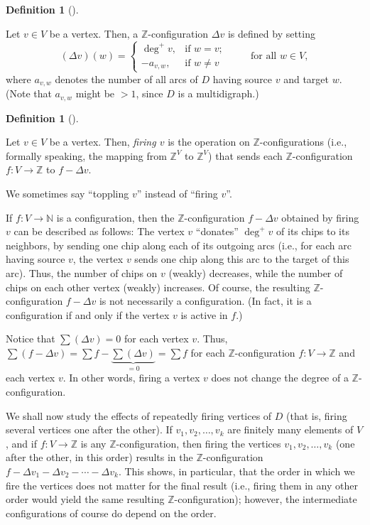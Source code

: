 \documentclass[numbers=enddot,12pt,final,onecolumn,notitlepage]{scrartcl}%
\theoremstyle{definition}
\newtheorem{defi}[theo]{Definition}
\newenvironment{definition}[1][]
{\begin{defi}[#1]\begin{leftbar}}
{\end{leftbar}\end{defi}}
\let\sumnonlimits\sum
\renewcommand{\sum}{\sumnonlimits\limits}
\newcommand{\NN}{\mathbb{N}}
\newcommand{\ZZ}{\mathbb{Z}}
\newcommand{\tup}[1]{\left( #1 \right)}
\begin{document}
\begin{definition}
Let $v \in V$ be a vertex.
Then, a $\ZZ$-configuration $\Delta v$ is defined by setting
\[
 \tup{\Delta v} \tup{w}
 = \begin{cases}
    \deg^+ v , & \text{if } w = v ; \\
    - a_{v, w}, & \text{if } w \neq v
   \end{cases}
  \qquad \text{ for all } w \in V ,
\]
where $a_{v, w}$ denotes the number of all arcs of $D$ having
source $v$ and target $w$.
(Note that $a_{v, w}$ might be $> 1$, since $D$ is a multidigraph.)
\end{definition}

\begin{definition}
Let $v \in V$ be a vertex.
Then, \textit{firing $v$} is the operation on
$\ZZ$-configurations (i.e., formally speaking, the mapping from
$\ZZ^V$ to $\ZZ^V$) that sends each $\ZZ$-configuration
$f : V \to \ZZ$ to $f - \Delta v$.

We sometimes say ``toppling $v$'' instead of ``firing $v$''.
\end{definition}

If $f : V \to \NN$ is a configuration, then the
$\ZZ$-configuration $f - \Delta v$ obtained by firing $v$ can be
described as follows:
The vertex $v$ ``donates'' $\deg^+ v$ of its chips to its
neighbors, by sending one chip along each of its outgoing arcs
(i.e., for each arc having source $v$, the vertex $v$ sends one
chip along this arc to the target of this arc).
Thus, the number of chips on $v$ (weakly) decreases, while the
number of chips on each other vertex (weakly) increases.
Of course, the resulting $\ZZ$-configuration $f - \Delta v$ is
not necessarily a configuration.
(In fact, it is a configuration if and only if the vertex $v$ is
active in $f$.)

Notice that $\sum \tup{\Delta v} = 0$ for each vertex $v$.
Thus,
$\sum \tup{f - \Delta v}
= \sum f - \underbrace{\sum \tup{\Delta v}}_{= 0}
= \sum f$
for each $\ZZ$-configuration $f : V \to \ZZ$ and each vertex $v$.
In other words, firing a vertex $v$ does not change the degree of
a $\ZZ$-configuration.

We shall now study the effects of repeatedly firing vertices
of $D$ (that is, firing several vertices one after the other).
If $v_1, v_2, \ldots, v_k$ are finitely many elements of $V$,
and if $f : V \to \ZZ$ is any $\ZZ$-configuration,
then firing the vertices $v_1, v_2, \ldots, v_k$
(one after the other, in this order) results in the
$\ZZ$-configuration
$f - \Delta v_1 - \Delta v_2 - \cdots - \Delta v_k$.
This shows, in particular, that the order in which we fire
the vertices does not matter for the final result
(i.e., firing them in any other order would yield the same
resulting $\ZZ$-configuration);
however, the intermediate configurations of course do depend
on the order.
\end{document}
